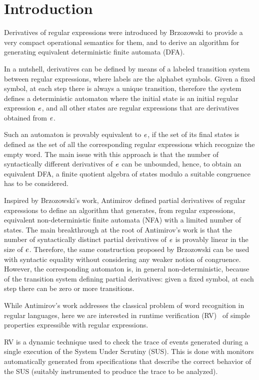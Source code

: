 \section{Introduction}\label{sec:intro}

Derivatives of regular expressions were introduced by Brzozowski \cite{Brzozowski64,OwensEtAl09}
to provide a very compact operational semantics for them, and to derive an algorithm for generating equivalent deterministic finite automata (DFA).

In a nutshell, derivatives can be defined by means of a labeled transition system between regular expressions, where labels are the alphabet symbols. Given a fixed symbol, at each step there is always a unique transition, therefore the system defines a deterministic automaton where the initial state is an initial regular expression $\mathit {e}$, and all other states are regular expressions that are derivatives obtained from $\mathit {e}$.

Such an automaton is provably equivalent to $\mathit {e}$,
if the set of its final states is defined as the set of all the corresponding regular expressions which recognize the empty word.
The main issue with this approach is that the number of syntactically different derivatives of $\mathit {e}$ can be unbounded, hence, to obtain an equivalent DFA, a finite quotient algebra of states modulo a suitable congruence has to be considered.

Inspired by Brzozowski's work, Antimirov \cite{Antimirov96} defined partial derivatives of regular expressions to define an algorithm that generates, from regular expressions, equivalent non-deterministic finite automata (NFA) with a limited number of states. The main breakthrough at the root of Antimirov's work is that the number of syntactically distinct partial derivatives of $\mathit {e}$ is provably linear in the size of $\mathit {e}$. Therefore, the same construction
proposed by Brzozowski can be used with syntactic equality without considering any weaker notion of congruence. However, the corresponding automaton is, in general non-deterministic, because
of the transition system defining partial derivatives: given a fixed symbol, at each step there can be zero or more transitions.

While Antimirov's work addresses the classical problem of word recognition in regular languages, here we are interested in runtime verification (RV)~\cite{LeuckerSchallhart09} of simple properties expressible with regular expressions.

RV is a dynamic technique used to check the trace of events generated during a single execution of the System Under Scrutiny (SUS). This is done with monitors automatically generated from specifications that describe the correct behavior of the SUS (suitably instrumented to produce the trace to be analyzed).

